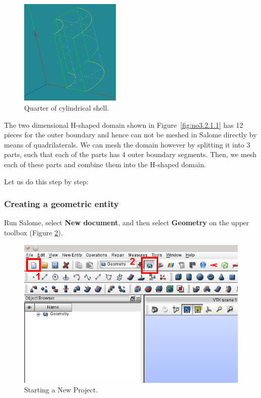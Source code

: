 \begin{figure}[tbp]
\begin{center}
\includegraphics[width=0.43\textwidth]{figures/salome02.png}
\caption{Quarter of cylindrical shell.}
\label{fig:no3.2.1.3}
\end{center}
\end{figure}

The two dimensional H-shaped domain shown in Figure~\ref{fig:no3.2.1.1} has 12 pieces for the outer boundary and hence can not be meshed in Salome directly by means of quadrilaterals. We can mesh the domain however by splitting it into 3 parts, such that each of the parts has 4 outer boundary segments. Then, we mesh each of these parts and combine them into the H-shaped domain.

Let us do this step by step:

\subsubsection{Creating a geometric entity}

Run Salome, select \textbf{New document}, and then select \textbf{Geometry} on the upper toolbox (Figure \ref{fig:no3.2.1.4}). 

\begin{figure}[tbp]
\begin{center}
\includegraphics[scale=0.60]{figures/SalomeStep1.png}
\caption{Starting a New Project.}
\label{fig:no3.2.1.4}
\end{center}
\end{figure}
  
